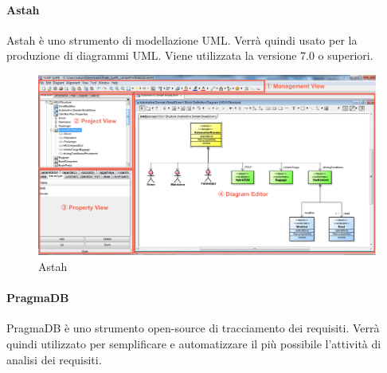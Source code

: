   \paragraph{Astah}
  Astah è uno strumento di modellazione UML. Verrà quindi usato per la produzione di diagrammi UML. Viene utilizzata la versione 7.0 o superiori.
\begin{figure}[h]
\centering
\includegraphics[scale=0.3]{img/astah.png}
\caption{Astah}\label{sec:Figura1}
\end{figure}
 \paragraph{PragmaDB} 
PragmaDB è uno strumento open-source di tracciamento dei requisiti. Verrà quindi utilizzato per semplificare e automatizzare il più possibile l'attività di analisi dei requisiti.



  
